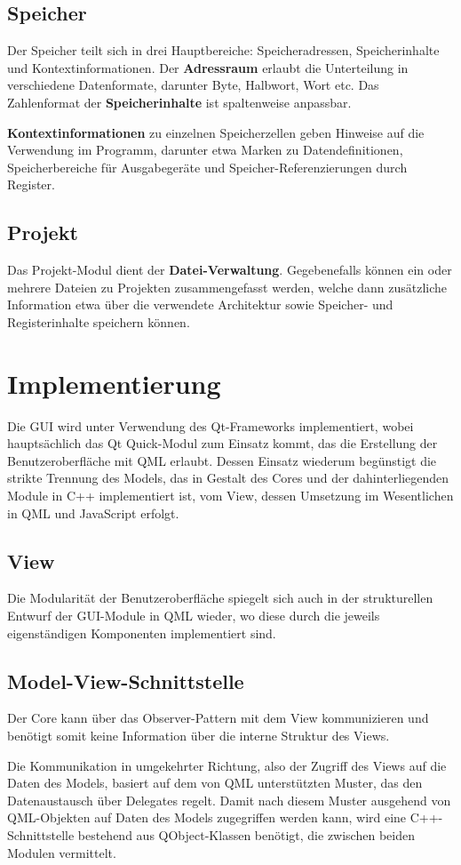 \subsection{Speicher}

Der Speicher teilt sich in drei Hauptbereiche: Speicheradressen, Speicherinhalte und Kontextinformationen.
Der \textbf{Adressraum} erlaubt die Unterteilung in verschiedene Datenformate, darunter Byte, Halbwort, Wort etc.
Das Zahlenformat der \textbf{Speicherinhalte} ist spaltenweise anpassbar.

\textbf{Kontextinformationen} zu einzelnen Speicherzellen geben Hinweise auf die Verwendung im Programm, darunter etwa Marken zu Datendefinitionen, Speicherbereiche für Ausgabegeräte und Speicher-Referenzierungen durch Register.

\subsection{Projekt}

Das Projekt-Modul dient der \textbf{Datei-Verwaltung}. Gegebenefalls können ein oder mehrere Dateien zu Projekten zusammengefasst werden, welche dann zusätzliche Information etwa über die verwendete Architektur sowie Speicher- und Registerinhalte speichern können.

\section{Implementierung}

Die GUI wird unter Verwendung des Qt-Frameworks implementiert, wobei hauptsächlich das Qt Quick-Modul zum Einsatz kommt, das die Erstellung der Benutzeroberfläche mit QML erlaubt. Dessen Einsatz wiederum begünstigt die strikte Trennung des Models, das in Gestalt des Cores und der dahinterliegenden Module in C++ implementiert ist, vom View, dessen Umsetzung im Wesentlichen in QML und JavaScript erfolgt.

\subsection{View}

Die Modularität der Benutzeroberfläche spiegelt sich auch in der strukturellen Entwurf der GUI-Module in QML wieder, wo diese durch die jeweils eigenständigen Komponenten implementiert sind.

\subsection{Model-View-Schnittstelle}

Der Core kann über das Observer-Pattern mit dem View kommunizieren und benötigt somit keine Information über die interne Struktur des Views.

Die Kommunikation in umgekehrter Richtung, also der Zugriff des Views auf die Daten des Models, basiert auf dem von QML unterstützten Muster, das den Datenaustausch über Delegates regelt. Damit nach diesem Muster ausgehend von QML-Objekten auf Daten des Models zugegriffen werden kann, wird eine C++-Schnittstelle bestehend aus QObject-Klassen benötigt, die zwischen beiden Modulen vermittelt.
